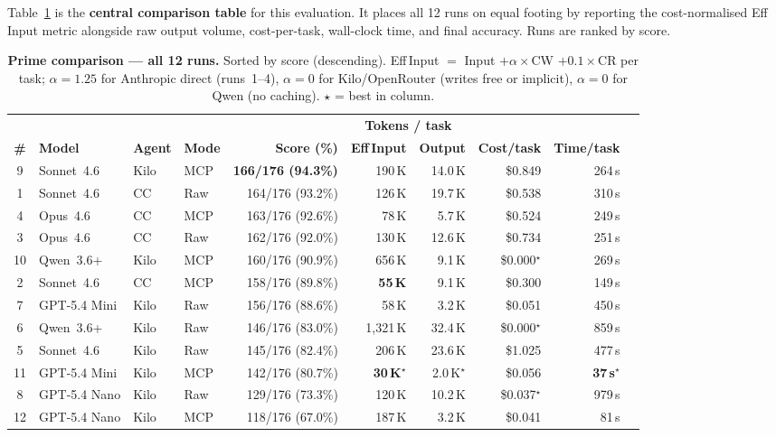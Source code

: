 Table~\ref{tab:prime} is the \textbf{central comparison table} for this evaluation.
It places all 12 runs on equal footing by reporting the cost-normalised
Eff\,Input metric alongside raw output volume, cost-per-task, wall-clock
time, and final accuracy.
Runs are ranked by score.

\begin{table}[htbp]
\centering
\caption{\textbf{Prime comparison --- all 12 runs.}
  Sorted by score (descending).
  Eff\,Input $=$ Input $+ \alpha \times$CW $+ 0.1\times$CR per task;
  $\alpha=1.25$ for Anthropic direct (runs~1--4), $\alpha=0$ for
  Kilo/OpenRouter (writes free or implicit), $\alpha=0$ for Qwen (no caching).
  $\star$ = best in column.
}\label{tab:prime}
\footnotesize
\setlength{\tabcolsep}{3.5pt}
\begin{tabular}{clllrrrrrr}
\toprule
 & & & & & \multicolumn{2}{c}{\textbf{Tokens / task}} & & \\
\cmidrule(lr){6-7}
\textbf{\#} & \textbf{Model} & \textbf{Agent} & \textbf{Mode}
  & \textbf{Score (\%)}
  & \textbf{Eff\,Input}
  & \textbf{Output}
  & \textbf{Cost/task}
  & \textbf{Time/task} \\
\midrule
\rowcolor{bestcol}
 9 & Sonnet~4.6   & Kilo & MCP & \textbf{166/176 (94.3\%)} & 190\,K  & 14.0\,K & \$0.849 & 264\,s \\
 1 & Sonnet~4.6   & CC   & Raw & 164/176 (93.2\%) & 126\,K  & 19.7\,K & \$0.538 & 310\,s \\
 4 & Opus~4.6     & CC   & MCP & 163/176 (92.6\%) & 78\,K   &  5.7\,K & \$0.524 & 249\,s \\
 3 & Opus~4.6     & CC   & Raw & 162/176 (92.0\%) & 130\,K  & 12.6\,K & \$0.734 & 251\,s \\
10 & Qwen~3.6+    & Kilo & MCP & 160/176 (90.9\%) & 656\,K  &  9.1\,K & \$0.000$^\star$ & 269\,s \\
 2 & Sonnet~4.6   & CC   & MCP & 158/176 (89.8\%) & \textbf{55\,K}   &  9.1\,K & \$0.300 & 149\,s \\
 7 & GPT-5.4 Mini & Kilo & Raw & 156/176 (88.6\%) & 58\,K   &  3.2\,K & \$0.051 & 450\,s \\
 6 & Qwen~3.6+    & Kilo & Raw & 146/176 (83.0\%) & 1,321\,K & 32.4\,K & \$0.000$^\star$ & 859\,s \\
 5 & Sonnet~4.6   & Kilo & Raw & 145/176 (82.4\%) & 206\,K  & 23.6\,K & \$1.025 & 477\,s \\
11 & GPT-5.4 Mini & Kilo & MCP & 142/176 (80.7\%) & \textbf{30\,K}$^\star$  &  2.0\,K$^\star$ & \$0.056 & \textbf{37\,s}$^\star$ \\
 8 & GPT-5.4 Nano & Kilo & Raw & 129/176 (73.3\%) & 120\,K  & 10.2\,K & \$0.037$^\star$ & 979\,s \\
12 & GPT-5.4 Nano & Kilo & MCP & 118/176 (67.0\%) & 187\,K  &  3.2\,K & \$0.041 & 81\,s \\
\bottomrule
\end{tabular}
\end{table}

